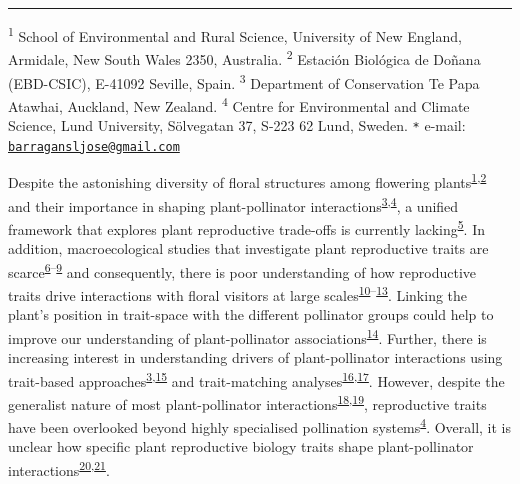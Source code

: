 \documentclass[
  12pt,
  a4paper,
]{article}
\begin{document}
\rule{\textwidth}{1pt}

\textsuperscript{1} School of Environmental and Rural Science, University of New England, Armidale, New South Wales 2350, Australia. \textsuperscript{2} Estación Biológica de Doñana (EBD-CSIC), E-41092 Seville, Spain. \textsuperscript{3} Department of Conservation \textbar{} Te Papa Atawhai, Auckland, New Zealand. \textsuperscript{4} Centre for Environmental and Climate Science, Lund University, Sölvegatan 37, S-223 62 Lund, Sweden. \texttt{*} e-mail: \href{mailto:barragansljose@gmail.com}{\nolinkurl{barragansljose@gmail.com}}

\doublespacing
\vspace{5mm}
\normalsize

Despite the astonishing diversity of floral structures among flowering plants\textsuperscript{\protect\hyperlink{ref-barrett2002}{1},\protect\hyperlink{ref-schiestl2013}{2}} and their importance in shaping plant-pollinator interactions\textsuperscript{\protect\hyperlink{ref-fenster2004}{3},\protect\hyperlink{ref-dellinger2020}{4}}, a unified framework that explores plant reproductive trade-offs is currently lacking\textsuperscript{\protect\hyperlink{ref-roddy2021}{5}}. In addition, macroecological studies that investigate plant reproductive traits are scarce\textsuperscript{\protect\hyperlink{ref-baude2016}{6}--\protect\hyperlink{ref-moeller2017}{9}} and consequently, there is poor understanding of how reproductive traits drive interactions with floral visitors at large scales\textsuperscript{\protect\hyperlink{ref-sargent2008}{10}--\protect\hyperlink{ref-ruger2018}{13}}. Linking the plant's position in trait-space with the different pollinator groups could help to improve our understanding of plant-pollinator associations\textsuperscript{\protect\hyperlink{ref-dehling2016}{14}}. Further, there is increasing interest in understanding drivers of plant-pollinator interactions using trait-based approaches\textsuperscript{\protect\hyperlink{ref-fenster2004}{3},\protect\hyperlink{ref-rosas2014}{15}} and trait-matching analyses\textsuperscript{\protect\hyperlink{ref-stang2009}{16},\protect\hyperlink{ref-bartomeus2016}{17}}. However, despite the generalist nature of most plant-pollinator interactions\textsuperscript{\protect\hyperlink{ref-waser1996}{18},\protect\hyperlink{ref-olesen2002}{19}}, reproductive traits have been overlooked beyond highly specialised pollination systems\textsuperscript{\protect\hyperlink{ref-dellinger2020}{4}}. Overall, it is unclear how specific plant reproductive biology traits shape plant-pollinator interactions\textsuperscript{\protect\hyperlink{ref-tur2013}{20},\protect\hyperlink{ref-devaux2014}{21}}.
\end{document}
